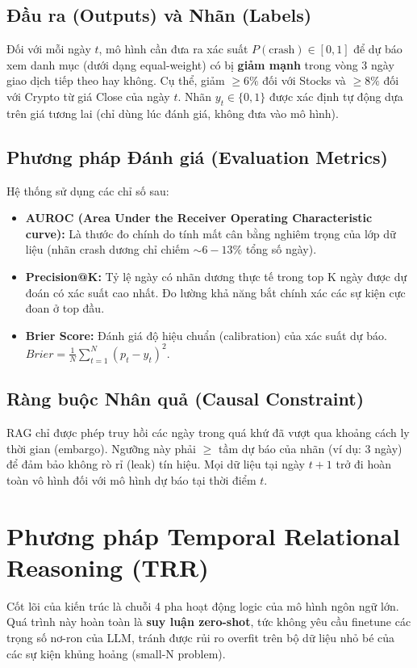 \documentclass[11pt, a4paper]{article}
\begin{document}
\subsection{Đầu ra (Outputs) và Nhãn (Labels)}
Đối với mỗi ngày $t$, mô hình cần đưa ra xác suất $P(\text{crash}) \in [0,1]$ để dự báo xem danh mục (dưới dạng equal-weight) có bị \textbf{giảm mạnh} trong vòng 3 ngày giao dịch tiếp theo hay không. Cụ thể, giảm $\ge 6\%$ đối với Stocks và $\ge 8\%$ đối với Crypto từ giá Close của ngày $t$. Nhãn $y_t \in \{0, 1\}$ được xác định tự động dựa trên giá tương lai (chỉ dùng lúc đánh giá, không đưa vào mô hình).

\subsection{Phương pháp Đánh giá (Evaluation Metrics)}
Hệ thống sử dụng các chỉ số sau:
\begin{itemize}
    \item \textbf{AUROC (Area Under the Receiver Operating Characteristic curve):} Là thước đo chính do tính mất cân bằng nghiêm trọng của lớp dữ liệu (nhãn crash dương chỉ chiếm $\sim 6-13\%$ tổng số ngày).
    \item \textbf{Precision@K:} Tỷ lệ ngày có nhãn dương thực tế trong top K ngày được dự đoán có xác suất cao nhất. Đo lường khả năng bắt chính xác các sự kiện cực đoan ở top đầu.
    \item \textbf{Brier Score:} Đánh giá độ hiệu chuẩn (calibration) của xác suất dự báo. $Brier = \frac{1}{N} \sum_{t=1}^{N} (p_t - y_t)^2$.
\end{itemize}

\subsection{Ràng buộc Nhân quả (Causal Constraint)}
RAG chỉ được phép truy hồi các ngày trong quá khứ đã vượt qua khoảng cách ly thời gian (embargo). Ngưỡng này phải $\ge$ tầm dự báo của nhãn (ví dụ: 3 ngày) để đảm bảo không rò rỉ (leak) tín hiệu. Mọi dữ liệu tại ngày $t+1$ trở đi hoàn toàn vô hình đối với mô hình dự báo tại thời điểm $t$.

\section{Phương pháp Temporal Relational Reasoning (TRR)}

Cốt lõi của kiến trúc là chuỗi 4 pha hoạt động logic của mô hình ngôn ngữ lớn. Quá trình này hoàn toàn là \textbf{suy luận zero-shot}, tức không yêu cầu finetune các trọng số nơ-ron của LLM, tránh được rủi ro overfit trên bộ dữ liệu nhỏ bé của các sự kiện khủng hoảng (small-N problem).
\end{document}
